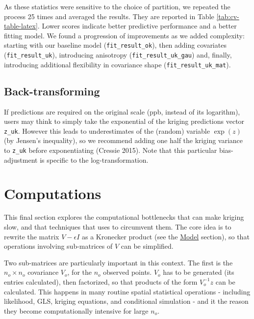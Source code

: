 As these statistics were sensitive to the choice of partition, we repeated the process 25 times and averaged the results. They are reported in Table
\ref{tab:cv-table-latex}. Lower scores indicate better predictive performance and a better fitting model. We found a progression of improvements as we added complexity: starting with our baseline model (\texttt{fit\_result\_ok}), then adding covariates (\texttt{fit\_result\_uk}), introducing anisotropy (\texttt{fit\_result\_uk\_gau}) and, finally, introducing additional flexibility in covariance shape (\texttt{fit\_result\_uk\_mat}).

\hypertarget{back-transforming}{%
\subsection{Back-transforming}\label{back-transforming}}

If predictions are required on the original scale (ppb, instead of its logarithm), users may think to simply take the exponential of the kriging predictions vector \texttt{z\_uk}. However this leads to underestimates of the (random) variable \(\exp(z)\) (by Jensen's inequality), so we recommend adding one half the kriging variance to \texttt{z\_uk} before exponentiating (Cressie 2015). Note that this particular bias-adjustment is specific to the log-transformation.

\hypertarget{computations}{%
\section{Computations}\label{computations}}

This final section explores the computational bottlenecks that can make kriging slow, and that techniques that  uses to circumvent them. The core idea is to rewrite the matrix \(V - \epsilon I\) as a Kronecker product (see the \protect\hyperlink{model}{Model} section), so that operations involving sub-matrices of \(V\) can be simplified.

Two sub-matrices are particularly important in this context. The first is the \(n_o \times n_o\) covariance \(V_o\), for the \(n_o\) observed points. \(V_o\) has to be generated (its entries calculated), then factorized, so that products of the form \(V_o^{-1} z\) can be calculated. This happens in many routine spatial statistical operations - including likelihood, GLS, kriging equations, and conditional simulation - and it the reason they become computationally intensive for large \(n_o\).

